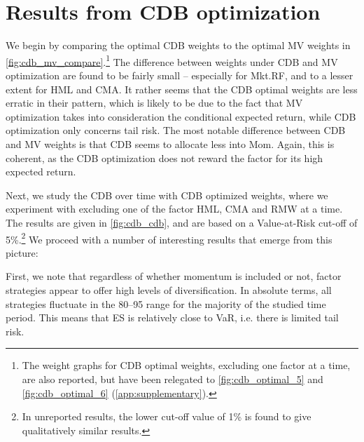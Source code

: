 
\section{Results from CDB optimization} %
\label{sec:cdb_optimization}


We begin by comparing the optimal CDB weights to the optimal MV weights in \autoref{fig:cdb_mv_compare}.\footnote{The weight graphs for CDB optimal weights, excluding one factor at a time, are also reported, but have been relegated to \autoref{fig:cdb_optimal_5} and \autoref{fig:cdb_optimal_6} (\autoref{app:supplementary}).} The difference between weights under CDB and MV optimization are found to be fairly small -- especially for Mkt.RF, and to a lesser extent for HML and CMA.  It rather seems that the CDB optimal weights are less erratic in their pattern, which is likely to be due to the fact that MV optimization takes into consideration the conditional expected return, while CDB optimization only concerns tail risk. The most notable difference between CDB and MV weights is that CDB seems to allocate less into Mom. Again, this is coherent, as the CDB optimization does not reward the factor for its high expected return. 

Next, we study the CDB over time with CDB optimized weights, where we experiment with excluding one of the factor HML, CMA and RMW at a time. The results are given in \autoref{fig:cdb_cdb}, and are based on a Value-at-Risk cut-off of 5\%.\footnote{In unreported results, the lower cut-off value of 1\% is found to give qualitatively similar results.} We proceed with a number of interesting results that emerge from this picture:

First, we note that regardless of whether momentum is included or not, factor strategies appear to offer high levels of diversification. In absolute terms, all strategies fluctuate in the 80--95 range for the majority of the studied time period. This means that ES is relatively close to VaR, i.e. there is limited tail risk.


